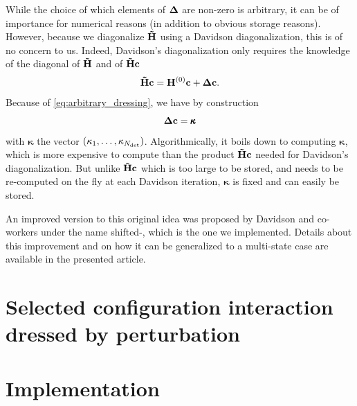 \documentclass[./thesis.tex]{subfiles}
\begin{document}
While the choice of which elements of ${\bf \Delta}$ are non-zero is arbitrary, it can be of importance for numerical reasons (in addition to obvious storage reasons). However, because we diagonalize ${\bf \tilde H}$ using a Davidson diagonalization, this is of no concern to us. Indeed, Davidson's diagonalization only requires the knowledge of the diagonal of ${\bf \tilde H}$ and of ${\bf \tilde H} {\bf c}$ 
\begin{equation}
{\bf \tilde H} {\bf c} = {\bf H}^{(0)} {\bf c} + {\bf \Delta} {\bf c}.
\end{equation}
Because of \ref{eq:arbitrary_dressing}, we have by construction
\begin{equation}
{\bf \Delta} {\bf c} = {\pmb \kappa}
\end{equation}
with ${\pmb \kappa}$ the vector $\qty(\kappa_1, \ldots, \kappa_{{N_\text{det}}})$.
Algorithmically, it boils down to computing ${\pmb \kappa}$, which is more expensive to compute than the product ${\bf \tilde H}{\bf c}$ needed for Davidson's diagonalization. But unlike ${\bf \tilde H}{\bf c}$ which is too large to be stored, and needs to be re-computed on the fly at each Davidson iteration, ${\pmb \kappa}$ is fixed and can easily be stored.


An improved version to this original idea was proposed by Davidson and co-workers under the name shifted-\Bk,\cite{Nitzsche_1978a, Nitzsche_1978b, Rawlings_1983, Kozlowski_1995, Kozlowski_1994a, Kozlowski_1994b, Kozlowski_1994c} which is the one we implemented. Details about this improvement and on how it can be generalized to a multi-state case are available in the presented article.


\section{Selected configuration interaction dressed by perturbation}






\section{Implementation}
\end{document}
